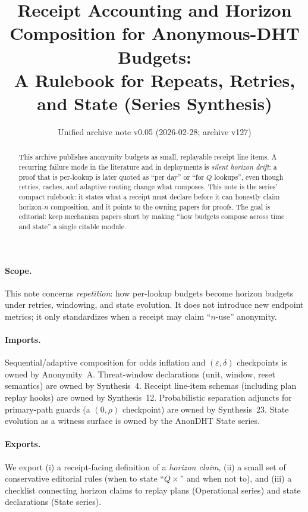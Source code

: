 \documentclass[11pt]{article}
\title{Receipt Accounting and Horizon Composition for Anonymous-DHT Budgets:\\
\large A Rulebook for Repeats, Retries, and State (Series Synthesis)}
\author{}
\date{Unified archive note v0.05 (2026-02-28; archive v127)}
\newcommand{\eps}{\varepsilon}
\begin{document}
\maketitle

\begin{abstract}
This archive publishes anonymity budgets as small, replayable receipt line items.
A recurring failure mode in the literature and in deployments is \emph{silent horizon drift}: a proof that is per-lookup is later quoted as ``per day'' or ``for $Q$ lookups'', even though retries, caches, and adaptive routing change what composes.
This note is the series' compact rulebook: it states what a receipt must declare before it can honestly claim horizon-$n$ composition, and it points to the owning papers for proofs.
The goal is editorial: keep mechanism papers short by making ``how budgets compose across time and state'' a single citable module.
\end{abstract}

\paragraph{Scope.}
This note concerns \emph{repetition}: how per-lookup budgets become horizon budgets under retries, windowing, and state evolution.
It does not introduce new endpoint metrics; it only standardizes when a receipt may claim ``$n$-use'' anonymity.

\paragraph{Imports.}
Sequential/adaptive composition for odds inflation and $(\eps,\delta)$ checkpoints is owned by Anonymity~A.\cite{series:oddsinflation}
Threat-window declarations (unit, window, reset semantics) are owned by Synthesis~4.\cite{series:threatwindows}
Receipt line-item schemas (including plan replay hooks) are owned by Synthesis~12.\cite{series:receiptitems}
Probabilistic separation adjuncts for primary-path guards (a $(0,\rho)$ checkpoint) are owned by Synthesis~23.\cite{series:probsep}
State evolution as a witness surface is owned by the AnonDHT State series.\cite{series:state1}

\paragraph{Exports.}
We export (i) a receipt-facing definition of a \emph{horizon claim}, (ii) a small set of conservative editorial rules (when to state ``$Q\times$'' and when not to), and (iii) a checklist connecting horizon claims to replay plans (Operational series) and state declarations (State series).
\end{document}
